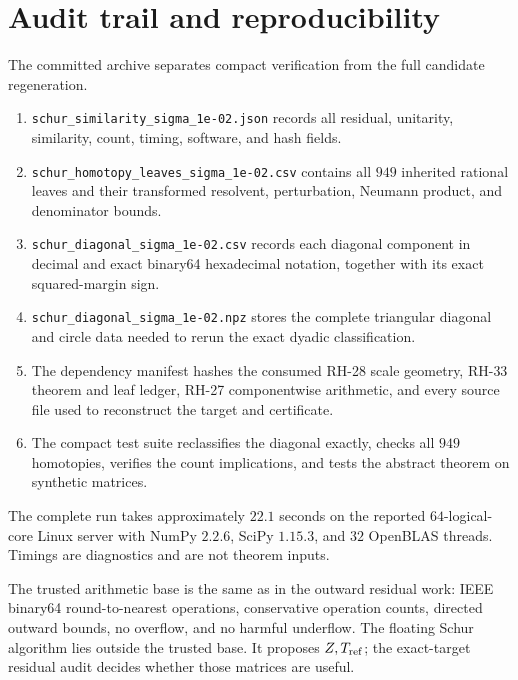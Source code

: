 \documentclass[11pt]{article}
\theoremstyle{definition}
\theoremstyle{remark}
\newcommand{\Tref}{T_{\rm ref}}
\begin{document}
\section{Audit trail and reproducibility}
\label{sec:audit}

The committed archive separates compact verification from the full
candidate regeneration.

\begin{enumerate}
 \item \texttt{schur\_similarity\_sigma\_1e-02.json} records all residual,
       unitarity, similarity, count, timing, software, and hash fields.
 \item \texttt{schur\_homotopy\_leaves\_sigma\_1e-02.csv} contains all
       \(949\) inherited rational leaves and their transformed resolvent,
       perturbation, Neumann product, and denominator bounds.
 \item \texttt{schur\_diagonal\_sigma\_1e-02.csv} records each diagonal
       component in decimal and exact binary64 hexadecimal notation,
       together with its exact squared-margin sign.
 \item \texttt{schur\_diagonal\_sigma\_1e-02.npz} stores the complete
       triangular diagonal and circle data needed to rerun the exact dyadic
       classification.
 \item The dependency manifest hashes the consumed RH-28 scale geometry,
       RH-33 theorem and leaf ledger, RH-27 componentwise arithmetic, and
       every source file used to reconstruct the target and certificate.
 \item The compact test suite reclassifies the diagonal exactly, checks all
       \(949\) homotopies, verifies the count implications, and tests the
       abstract theorem on synthetic matrices.
\end{enumerate}

The complete run takes approximately \(22.1\) seconds on the reported
\(64\)-logical-core Linux server with NumPy \(2.2.6\), SciPy \(1.15.3\),
and \(32\) OpenBLAS threads.  Timings are diagnostics and are not theorem
inputs.

The trusted arithmetic base is the same as in the outward residual work:
IEEE binary64 round-to-nearest operations, conservative operation counts,
directed outward bounds, no overflow, and no harmful underflow.  The
floating Schur algorithm lies outside the trusted base.  It proposes
\(Z,\Tref\); the exact-target residual audit decides whether those matrices
are useful.
\end{document}

